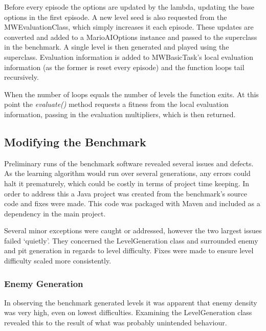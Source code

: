 Before every episode the options are updated by the lambda, updating the base options in the first episode. A new level seed is also requested from the MWEvaluationClass, which simply increases it each episode. These updates are converted and added to a MarioAIOptions instance and passed to the superclass in the benchmark. A single level is then generated and played using the superclass. Evaluation information is added to MWBasicTask's local evaluation information (as the former is reset every episode) and the function loops tail recursively.

When the number of loops equals the number of levels the function exits. At this point the \emph{evaluate()} method requests a fitness from the local evaluation information, passing in the evaluation multipliers, which is then returned.


\subsection{Modifying the Benchmark}
\label{subsec:enginemod}

Preliminary runs of the benchmark software revealed several issues and defects. As the learning algorithm would run over several generations, any errors could halt it prematurely, which could be costly in terms of project time keeping. In order to address this a Java project was created from the benchmark's source code and fixes were made. This code was packaged with Maven and included as a dependency in the main project.

Several minor exceptions were caught or addressed, however the two largest issues failed `quietly'. They concerned the LevelGeneration class and surrounded enemy and pit generation in regards to level difficulty. Fixes were made to ensure level difficulty scaled more consistently.

\subsubsection{Enemy Generation}

In observing the benchmark generated levels it was apparent that enemy density was very high, even on lowest difficulties. Examining the LevelGeneration class revealed this to the result of what was probably unintended behaviour. 

